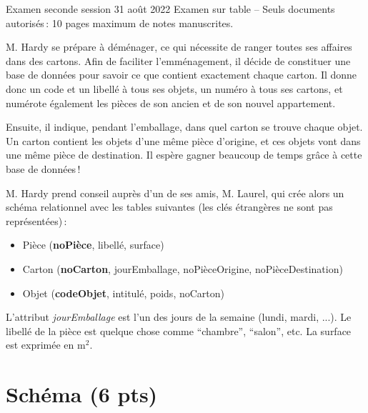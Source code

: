 %
{Examen seconde session 31 août 2022}%
{Examen sur table -- Seuls documents autorisés\,: 10 pages maximum de notes manuscrites.}%

M. Hardy se prépare à déménager, ce qui nécessite
de ranger toutes ses affaires dans des cartons.
Afin de faciliter l'emménagement, il décide de constituer
une base de données pour savoir ce que contient
exactement chaque carton. Il donne donc un code
et un libellé à tous ses objets, un numéro à
tous ses cartons, et numérote également
les pièces de son ancien et de son nouvel appartement.

Ensuite, il indique, pendant l'emballage, dans quel
carton se trouve chaque objet. Un carton
contient les objets d'une même pièce d'origine, et
ces objets vont dans une même pièce de destination.
Il espère gagner beaucoup de temps grâce à cette base de données\,!

M. Hardy prend conseil auprès d'un de ses amis, M. Laurel, qui
crée alors un schéma relationnel avec les tables suivantes
(les clés étrangères ne sont pas représentées)\,:

      \begin{itemize}
        \item Pièce (\textbf{noPièce}, libellé, surface)
        \item Carton (\textbf{noCarton}, jourEmballage, noPièceOrigine,
                            noPièceDestination)
        \item  Objet (\textbf{codeObjet}, intitulé, poids,
                     noCarton)
       \end{itemize}

L'attribut \textit{jourEmballage} est l'un
des jours de la semaine (lundi, mardi, ...). Le libellé
de la pièce est quelque chose comme ``chambre'', ``salon'',
etc. La surface est exprimée en m$^2$.

\section{Schéma (6 pts)}

